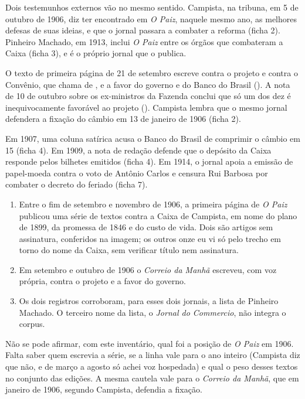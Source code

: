 Dois testemunhos externos vão no mesmo sentido. Campista, na tribuna, em 5 de
outubro de 1906, diz ter encontrado em \textit{O Paiz}, naquele mesmo ano, as
melhores defesas de suas ideias, e que o jornal passara a combater a reforma
(ficha 2). Pinheiro Machado, em 1913, inclui \textit{O Paiz} entre os órgãos
que combateram a Caixa (ficha 3), e é o próprio jornal que o publica.


O texto de primeira página de 21 de setembro escreve contra o projeto e contra
o Convênio, que chama de , e a favor do governo e do Banco do Brasil
(). A nota de 10 de outubro
sobre os ex-ministros da Fazenda conclui que só um dos dez é inequivocamente
favorável ao projeto (). Campista
lembra que o mesmo jornal defendera a fixação do câmbio em 13 de janeiro de
1906 (ficha 2).


Em 1907, uma coluna satírica acusa o Banco do Brasil de comprimir o câmbio em
15 (ficha 4). Em 1909, a nota de redação defende que o depósito da Caixa
responde pelos bilhetes emitidos (ficha 4). Em 1914, o jornal apoia a emissão
de papel-moeda contra o voto de Antônio Carlos e censura Rui Barbosa por
combater o decreto do feriado (ficha 7).


\begin{enumerate}[leftmargin=*,nosep]
\item Entre o fim de setembro e novembro de 1906, a primeira página de
\textit{O Paiz} publicou uma série de textos contra a Caixa de Campista, em
nome do plano de 1899, da promessa de 1846 e do custo de vida. Dois são artigos
sem assinatura, conferidos na imagem; os outros onze eu vi só pelo trecho em
torno do nome da Caixa, sem verificar título nem assinatura.
\item Em setembro e outubro de 1906 o \textit{Correio da Manhã} escreveu, com
voz própria, contra o projeto e a favor do governo.
\item Os dois registros corroboram, para esses dois jornais, a lista de Pinheiro
Machado. O terceiro nome da lista, o \textit{Jornal do Commercio}, não integra
o corpus.
\end{enumerate}


Não se pode afirmar, com este inventário, qual foi a posição de \textit{O Paiz}
em 1906. Falta saber quem escrevia a série, se a linha vale para o ano inteiro
(Campista diz que não, e de março a agosto só achei voz hospedada) e qual o
peso desses textos no conjunto das edições. A mesma cautela vale para o
\textit{Correio da Manhã}, que em janeiro de 1906, segundo Campista, defendia a
fixação.
